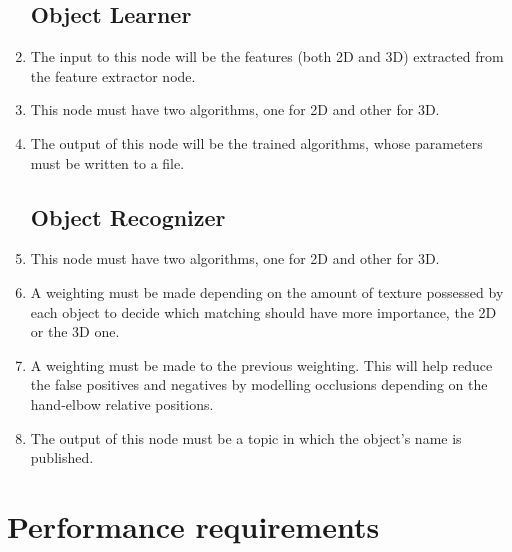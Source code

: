 \documentclass{article}
\makeatletter
\def\threedigits#1{\expandafter\@threedigits\csname c@#1\endcsname}
\def\@threedigits#1{%
  \ifnum#1<100 0\fi
  \ifnum#1<10 0\fi
  \number#1}
\makeatother
\begin{document}
\begin{center}
\begin{enumerate}[label=\textbf{FR\threedigits*}, leftmargin=2cm]
\subsection{Object Learner}
	\item The input to this node will be the features (both 2D and 3D) extracted from the feature extractor node. 
	\item This node must have two algorithms, one for 2D and other for 3D. 
	\item The output of this node will be the trained algorithms, whose parameters must be written to a file. 

\subsection{Object Recognizer}
	\item This node must have two algorithms, one for 2D and other for 3D. 
	\item A weighting must be made depending on the amount of texture possessed by each object to decide which matching should have more importance, the 2D or the 3D one. 
	\item A weighting must be made to the previous weighting. This will help reduce the false positives and negatives by modelling occlusions depending on the hand-elbow relative positions. 
	\item The output of this node must be a topic in which the object's name is published.
	






\end{enumerate}



\section{Performance requirements}


\end{center}
\end{document}
